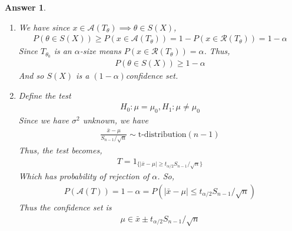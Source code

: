 \documentclass[12pt]{article}
\theoremstyle{colon}
\newtheorem*{answer}{Answer}
\begin{document}
\begin{answer}
  \leavevmode
  \begin{enumerate}[label=\arabic*)]
    \item We have since $x \in \mathcal{A}(T_\theta) \implies \theta \in S(X)$,
      \begin{gather*}
        P(\theta \in S(X)) \geq P(x \in \mathcal{A}(T_\theta)) = 1 - P(x \in \mathcal{R}(T_\theta)) = 1 - \alpha
      \end{gather*}
      Since $T_{\theta_0}$ is an $\alpha$-size means $P(x \in \mathcal{R}(T_\theta)) = \alpha$. Thus,
      \begin{gather*}
        P(\theta \in S(X)) \geq 1 - \alpha
      \end{gather*}
      And so $S(X)$ is a $(1-\alpha)$confidence set.
    \item Define the test
      \begin{gather*}
        H_0 : \mu = \mu_0, H_1 : \mu \neq \mu_0
      \end{gather*}
      Since we have $\sigma^2$ unknown, we have
      \begin{gather*}
        \frac{\bar{x} - \mu}{S_{n-1}/\sqrt{n}} \sim \text{t-distribution}(n-1)
      \end{gather*}
      Thus, the test becomes,
      \begin{gather*}
        T = 1_{ \{ \lvert \bar{x} - \mu \rvert \geq t_{\alpha/2} S_{n-1}/\sqrt{n} \} }
      \end{gather*}
      Which has probability of rejection of $\alpha$. So,
      \begin{gather*}
        P(\mathcal{A}(T)) = 1 - \alpha = P(\lvert \bar{x} - \mu \rvert \leq t_{\alpha/2} S_{n-1}/\sqrt{n})
      \end{gather*}
      Thus the confidence set is
      \begin{gather*}
        \mu \in \bar{x} \pm t_{\alpha/2} S_{n-1}/\sqrt{n}
      \end{gather*}
  \end{enumerate}
\end{answer}

\clearpage
\end{document}
